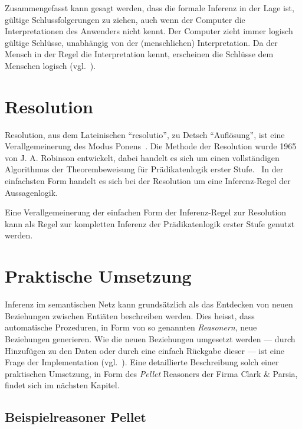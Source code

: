Zusammengefasst kann gesagt werden, dass die formale Inferenz in der Lage ist, gültige Schlussfolgerungen zu ziehen, auch wenn der Computer die Interpretationen des Anwenders nicht kennt. Der Computer zieht immer logisch gültige Schlüsse, unabhängig von der (menschlichen) Interpretation. Da der Mensch in der Regel die Interpretation kennt, erscheinen die Schlüsse dem Menschen logisch (vgl.~\cite[S. 165]{russel}).

\section{Resolution}
\label{sec:resolution}

Resolution, aus dem Lateinischen ``resolutio'', zu Detsch ``Auflösung'', ist eine Verallgemeinerung des Modus Ponens~\cite[S. 279]{russel}. Die Methode der Resolution wurde 1965 von J. A. Robinson entwickelt, dabei handelt es sich um einen vollständigen Algorithmus der Theorembeweisung für Prädikatenlogik erster Stufe.~\cite[S. 18]{russel} In der einfachsten Form handelt es sich bei der Resolution um eine Inferenz-Regel der Aussagenlogik.~\cite[S. 277]{russel}

Eine Verallgemeinerung der einfachen Form der Inferenz-Regel zur Resolution kann als Regel zur kompletten Inferenz der Prädikatenlogik erster Stufe genutzt werden.~\cite[S. 278]{russel}

\section{Praktische Umsetzung}
\label{sec:inferenz_praktisch}

Inferenz im semantischen Netz kann grundsätzlich als das Entdecken von neuen Beziehungen zwischen Entiäten beschreiben werden. Dies heisst, dass automatische Prozeduren, in Form von so genannten \textit{Reasonern}, neue Beziehungen generieren. Wie die neuen Beziehungen umgesetzt werden --- durch Hinzufügen zu den Daten oder durch eine einfach Rückgabe dieser --- ist eine Frage der Implementation (vgl.~\cite[Abschnitt 1]{w3inference}). Eine detaillierte Beschreibung solch einer praktischen Umsetzung, in Form des \textit{Pellet} Reasoners der Firma Clark \& Parsia, findet sich im nächsten Kapitel.

\subsection{Beispielreasoner Pellet}
\label{subsec:inferenz_pellet}

